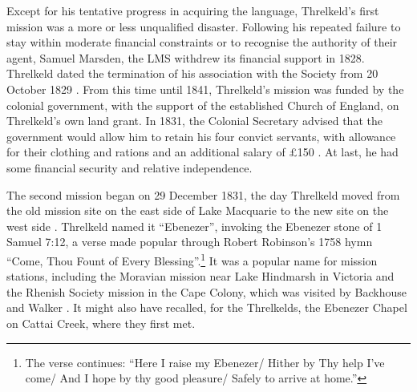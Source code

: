 {Except for his tentative progress in acquiring the language, Threlkeld’s first mission was a more or less unqualified disaster. Following his repeated failure to stay within moderate financial constraints or to recognise the authority of their agent, Samuel Marsden, the LMS withdrew its financial support in 1828. Threlkeld dated the termination of his association with the Society from 20 October 1829 \citep[114]{gunson_australian_1974a}. From this time until 1841, Threlkeld’s mission was funded by the colonial government, with the support of the established Church of England, on Threlkeld’s own land grant. In 1831, the Colonial Secretary advised that the government would allow him to retain his four convict servants, with allowance for their clothing and rations and an additional salary of £150 \citep[115]{gunson_australian_1974a}. At last, he had some financial security and relative independence.

The second mission began on 29 December 1831, the day Threlkeld moved from the old mission site on the east side of Lake Macquarie to the new site on the west side \citep[115]{gunson_australian_1974a}. Threlkeld named it “Ebenezer”, invoking the Ebenezer stone of 1 Samuel 7:12, a verse made popular through Robert Robinson’s 1758 hymn “Come, Thou Fount of Every Blessing”.\footnote{The verse continues: “Here I raise my Ebenezer/ Hither by Thy help I’ve come/ And I hope by thy good pleasure/ Safely to arrive at home.”} It was a popular name for mission stations, including the Moravian mission near Lake Hindmarsh in Victoria and the Rhenish Society mission in the Cape Colony, which was visited by Backhouse and Walker \citep[59, 71]{backhouse_extracts_1840}. It might also have recalled, for the Threlkelds, the Ebenezer Chapel on Cattai Creek, where they first met.

}

